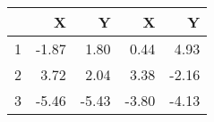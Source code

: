 \begin{tabular}{rrrrr}
  \hline
 & X & Y & X & Y \\ 
  \hline
1 & -1.87 & 1.80 & 0.44 & 4.93 \\ 
  2 & 3.72 & 2.04 & 3.38 & -2.16 \\ 
  3 & -5.46 & -5.43 & -3.80 & -4.13 \\ 
   \hline
\end{tabular}
